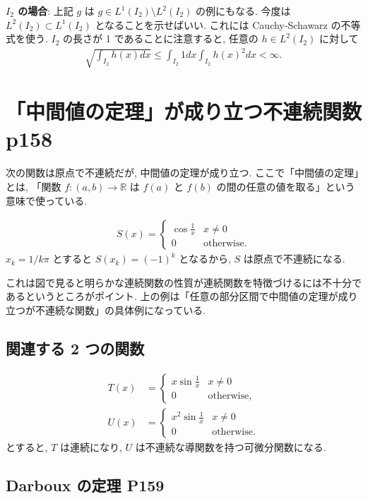 \documentclass[openany, a4paper, oneside]{jsbook}
\theoremstyle{break}
\theoremstyle{breakdefn}
\begin{document}
\textbf{$I_2$ の場合}:
上記 $g$ は $g \in L^1 (I_2) \setminus L^2 (I_2)$ の例にもなる.
今度は $L^2 (I_2) \subset L^1 (I_2)$ となることを示せばいい.
これには Cauchy-Schawarz の不等式を使う.
$I_2$ の長さが 1 であることに注意すると, 任意の $h \in L^2 (I_2)$ に対して
\begin{align}
 \sqrt{ \int_{I_2} h (x) dx}
 \leq
 \int_{I_2} 1 dx \int_{I_2} h (x)^2 dx < \infty.
\end{align}
\section{「中間値の定理」が成り立つ不連続関数 \cite{WilliamDumham1} p158}


次の関数は原点で不連続だが, 中間値の定理が成り立つ.
ここで「中間値の定理」とは, 「関数 $f \colon (a, b) \to \mathbb{R}$ は $f (a)$ と $f (b)$ の間の任意の値を取る」という意味で使っている.

\begin{align}
 S (x)
 =
 \begin{cases}
  \cos \frac{1}{x} & x \neq 0 \\
  0 & \mathrm{otherwise}.
 \end{cases}
\end{align}
$x_k = 1 / k \pi$ とすると $S (x_k) = (-1)^k$ となるから, $S$ は原点で不連続になる.

これは図で見ると明らかな連続関数の性質が連続関数を特徴づけるには不十分であるというところがポイント.
上の例は「任意の部分区間で中間値の定理が成り立つが不連続な関数」の具体例になっている.
\subsection{関連する 2 つの関数}


\begin{align}
 T (x)
 &=
 \begin{cases}
  x \sin \frac{1}{x} & x \neq 0 \\
  0 & \mathrm{otherwise},
 \end{cases} \\
 U (x)
 &=
 \begin{cases}
  x^2 \sin \frac{1}{x} & x \neq 0 \\
  0 & \mathrm{otherwise}.
 \end{cases}
\end{align}
とすると, $T$ は連続になり, $U$ は不連続な導関数を持つ可微分関数になる.
\subsection{Darboux の定理 \cite{WilliamDumham1} P159}
\end{document}
